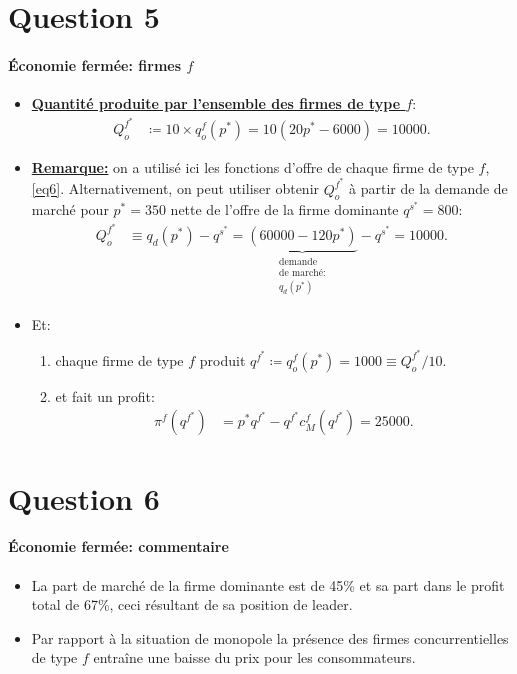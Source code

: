   \section{Question 5}
  \frame{\sectionpage}
  \begin{frame}[allowframebreaks]{\insertsection}
   \framesubtitle{Économie fermée: firmes $f$}
  \begin{itemize}
  \item \underline{\textbf{Quantité produite par l'ensemble des firmes de type $f$}}:
  \begin{align*}
  Q^{f^*}_o &\coloneqq 10\times q^f_o(p^*) = 10(20p^* - 6000) = 10000.
  \end{align*}
  \item \underline{\textbf{Remarque:}} on a utilisé ici les fonctions d'offre de chaque firme de type $f$, \eqref{eq6}. Alternativement, on peut utiliser
  obtenir $Q^{f^*}_o$ à partir de la demande de marché pour $p^* = 350$ nette de l'offre de la firme dominante $q^{s^*} = 800$:
  \begin{align*}
   Q^{f^*}_o &\equiv q_d(p^*) - q^{s^*}= \underbrace{(60000 - 120p^*)}_{\substack{\text{demande} \\ \text{de marché:} \\ q_d(p^*) }} - q^{s^*} = 10000.
  \end{align*}
  \item Et:
  \begin{enumerate}[$\cdot$]
  \item chaque firme de type $f$ produit $q^{f^*} \coloneqq q_o^f(p^*) = 1000 \equiv Q^{f^*}_o/10$.
  \item et fait un profit:
  \begin{align*}
  \pi^f(q^{f^*}) &= p^*q^{f^*} - q^{f^*} c_M^f(q^{f^*})  = 25000.
  \end{align*}
  \end{enumerate}
  \end{itemize}
  \end{frame}
  
   \section{Question 6}
  \frame{\sectionpage}
  \begin{frame}[allowframebreaks]{\insertsection}
   \framesubtitle{Économie fermée: commentaire}
  \begin{itemize}
  \item La part de marché de la firme dominante est de 45\% et sa part dans le profit total de 67\%, ceci résultant de sa position de leader.
  \item Par rapport à la situation de monopole la présence des firmes concurrentielles de type $f$ entraîne une baisse du prix pour les consommateurs.
    \end{itemize}
  \end{frame}
  
